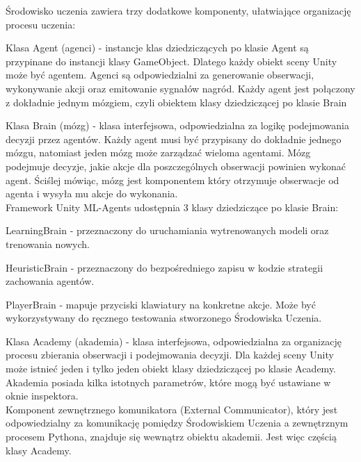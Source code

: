 Środowisko uczenia zawiera trzy dodatkowe komponenty, ułatwiające organizację procesu uczenia:
\begin{enumerate*}
\item Klasa Agent (agenci) - instancje klas dziedziczących po klasie Agent są przypinane do instancji klasy GameObject. Dlatego każdy obiekt sceny Unity może być agentem. Agenci są odpowiedzialni za generowanie obserwacji, wykonywanie akcji oraz emitowanie sygnałów nagród. Każdy agent jest połączony z dokładnie jednym mózgiem, czyli obiektem klasy dziedziczącej po klasie Brain
\item Klasa Brain (mózg) - klasa interfejsowa, odpowiedzialna za logikę podejmowania decyzji przez agentów. Każdy agent musi być przypisany do dokładnie jednego mózgu, natomiast jeden mózg może zarządzać wieloma agentami. 
Mózg podejmuje decyzje, jakie akcje dla poszczególnych obserwacji powinien wykonać agent. Ściślej mówiąc, mózg jest komponentem który otrzymuje obserwacje od agenta i wysyła mu akcje do wykonania. \\
Framework Unity ML-Agents udostępnia 3 klasy dziedziczące po klasie Brain:
\begin{itemize*}
\item LearningBrain - przeznaczony do uruchamiania wytrenowanych modeli oraz trenowania nowych.
\item HeuristicBrain - przeznaczony do bezpośredniego zapisu w kodzie strategii zachowania agentów.
\item PlayerBrain - mapuje przyciski klawiatury na konkretne akcje. Może być wykorzystywany do ręcznego testowania stworzonego Środowiska Uczenia.
\end{itemize*}
\item Klasa Academy (akademia) - klasa interfejsowa, odpowiedzialna za organizację procesu zbierania obserwacji i podejmowania decyzji. Dla każdej sceny Unity może istnieć jeden i tylko jeden obiekt klasy dziedziczącej po klasie Academy. Akademia posiada kilka istotnych parametrów, które mogą być ustawiane w oknie inspektora. \\
Komponent zewnętrznego komunikatora (External Communicator), który jest odpowiedzialny za komunikację pomiędzy Środowiskiem Uczenia a zewnętrznym procesem Pythona, znajduje się wewnątrz obiektu akademii.
Jest więc częścią klasy Academy.
\end{enumerate*}

